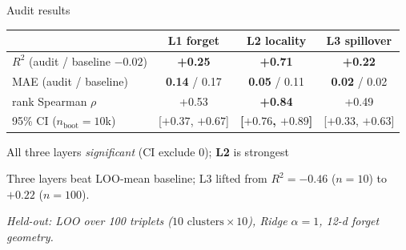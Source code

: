 \documentclass[aspectratio=169,10pt]{beamer}
\begin{document}
\begin{frame}{Audit results}
    \centering
    \begin{tabular}{@{}lccc@{}}
        \toprule
        & L1 forget & L2 locality & L3 spillover \\
        \midrule
        $R^2$ (audit / baseline $-0.02$) & \textbf{+0.25} & \textbf{+0.71} & \textbf{+0.22} \\
        MAE (audit / baseline)   & \textbf{0.14} / 0.17 & \textbf{0.05} / 0.11 & \textbf{0.02} / 0.02 \\
        rank Spearman $\rho$     & +0.53 & \textbf{+0.84} & +0.49 \\
        95\% CI ($n_\text{boot}=10$k) & [$+0.37$, $+0.67$] & \textbf{[$+0.76$, $+0.89$]} & [$+0.33$, $+0.63$] \\
        \bottomrule
    \end{tabular}

    \vspace{0.7em}
    \begin{center}
        \Large
        All three layers \emph{significant} (CI exclude 0); \textbf{L2} is strongest
    \end{center}
    \vspace{0.2em}
    \begin{center}
        \normalsize
        Three layers beat LOO-mean baseline; L3 lifted from $R^2=-0.46$ ($n=10$) to $+0.22$ ($n=100$).
    \end{center}

    \vspace{0.2em}
    \footnotesize\centering\itshape
    Held-out: LOO over 100 triplets ($10\text{ clusters} \times 10$), Ridge $\alpha=1$, 12-d forget geometry.
\end{frame}
\end{document}
